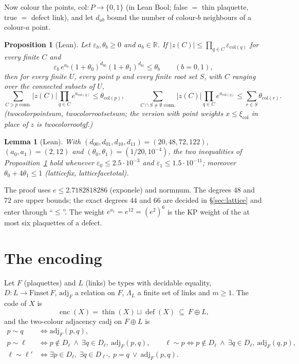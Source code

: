 \documentclass[11pt,a4paper]{article}
\newtheorem{lemma}[theorem]{Lemma}
\newtheorem{proposition}[theorem]{Proposition}
\theoremstyle{definition}
\theoremstyle{remark}
\DeclareRobustCommand{\lean}[1]{{\ttfamily\renewcommand{\_}{\textunderscore\allowbreak}#1}}
\newcommand{\R}{\mathbb{R}}
\newcommand{\thin}{\operatorname{thin}}
\newcommand{\dfc}{\operatorname{def}}
\newcommand{\enc}{\operatorname{enc}}
\begin{document}
Now colour the points, $\mathrm{col}:P\to\{0,1\}$ (in Lean \lean{Bool}; \lean{false} $=$ thin plaquette, \lean{true} $=$ defect link), and let $d_{ab}$ bound the number of colour-$b$ neighbours of a colour-$a$ point.

\begin{proposition}[Lean]\label{prop:twocol}
Let $\varepsilon_b,\theta_b\ge0$ and $a_b\in\R$. If $|z(C)|\le\prod_{q\in C}\varepsilon_{\mathrm{col}(q)}$ for every finite $C$ and
\[
\varepsilon_b\,e^{a_b}(1+\theta_0)^{d_{b0}}(1+\theta_1)^{d_{b1}}\le\theta_b\qquad(b=0,1),
\]
then for every finite $U$, every point $p$ and every finite root set $S$, with $C$ ranging over the connected subsets of $U$,
\[
\sum_{C\ni p\text{ conn.}}|z(C)|\prod_{q\in C}e^{a_{\mathrm{col}(q)}}\le\theta_{\mathrm{col}(p)},\qquad
\sum_{C\cap S\ne\emptyset\text{ conn.}}|z(C)|\prod_{q\in C}e^{a_{\mathrm{col}(q)}}\le\sum_{r\in S}\theta_{\mathrm{col}(r)}.
\]
(\lean{two\_color\_point\_sum}, \lean{two\_color\_root\_set\_sum}; the version with point weights $x\le\xi_{\mathrm{col}}$ in place of $z$ is \lean{two\_color\_root\_gf}.)
\end{proposition}

\begin{lemma}[Lean]\label{lem:fix}
With $(d_{00},d_{01},d_{10},d_{11})=(20,48,72,122)$, $(a_0,a_1)=(2,12)$ and $(\theta_0,\theta_1)=(1/20,10^{-4})$, the two inequalities of Proposition~\ref{prop:twocol} hold whenever $\varepsilon_0\le2.5\cdot10^{-3}$ and $\varepsilon_1\le1.5\cdot10^{-11}$; moreover $\theta_0+4\theta_1\le1$ (\lean{lattice\_fix}, \lean{lattice\_face\_total}).
\end{lemma}
The proof uses $e\le2.7182818286$ (\lean{exp\_one\_le}) and \lean{norm\_num}. The degrees $48$ and $72$ are upper bounds; the exact degrees $44$ and $66$ are decided in \S\ref{sec:lattice} and enter through ``$\le$''. The weight $e^{a_1}=e^{12}=(e^{2})^{6}$ is the KP weight of the at most six plaquettes of a defect.

\section{The encoding}\label{sec:encoding}

Let $F$ (plaquettes) and $L$ (links) be types with decidable equality, $D:L\to\mathrm{Finset}\,F$, $\mathrm{adj}_F$ a relation on $F$, $\Lambda_L$ a finite set of links and $m\ge1$. The code of $X$ is
\[
\enc(X)=\thin(X)\sqcup\dfc(X)\ \subseteq\ F\oplus L ,
\]
and the two-colour adjacency \lean{cadj} on $F\oplus L$ is
\begin{align*}
p\sim q &\iff \mathrm{adj}_F(p,q),\\
p\sim\ell &\iff p\notin D_\ell\ \wedge\ \exists q\in D_\ell,\ \mathrm{adj}_F(p,q),\qquad
\ell\sim p \iff p\notin D_\ell\ \wedge\ \exists q\in D_\ell,\ \mathrm{adj}_F(q,p),\\
\ell\sim\ell' &\iff \exists p\in D_\ell,\ \exists q\in D_{\ell'},\ p=q\ \vee\ \mathrm{adj}_F(p,q).
\end{align*}
\end{document}
